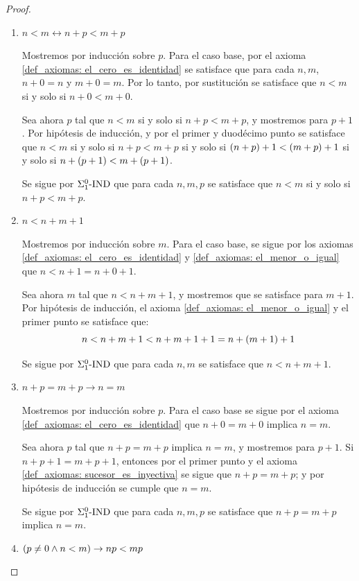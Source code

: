 \begin{proof}
\begin{enumerate}
		\item $ n < m\leftrightarrow n + p < m + p$
		
		Mostremos por inducción sobre $p$. Para el caso base, por el axioma \ref{def_axiomas: el_cero_es_identidad} se satisface que para cada $n, m$, $n + 0 = n$ y $m + 0 = m$. Por lo tanto, por sustitución se satisface que $n < m$ si y solo si $n + 0 < m + 0$.

		Sea ahora $p$ tal que $n < m$ si y solo si $n + p < m + p$, y mostremos para $p + 1$. Por hipótesis de inducción, y por el primer y duodécimo punto se satisface que $n < m$ si y solo si $n + p < m + p$ si y solo si $\pa*{n + p} + 1 <\pa*{m + p} + 1$ si y solo si $n +\pa*{p + 1} < m +\pa*{p + 1}$.

		Se sigue por $\INDUCCION{\Sigma_{1}^{0}}$ que para cada $n, m, p$ se satisface que $n < m$ si y solo si $n + p < m + p$.

		\item $n < n + m + 1$
		
		Mostremos por inducción sobre $m$. Para el caso base, se sigue por los axiomas \ref{def_axiomas: el_cero_es_identidad} y \ref{def_axiomas: el_menor_o_igual} que $n < n + 1 = n + 0 + 1$.

		Sea ahora $m$ tal que $n < n + m + 1$, y mostremos que se satisface para $m + 1$. Por hipótesis de inducción, el axioma \ref{def_axiomas: el_menor_o_igual} y el primer punto se satisface que:
		\[
			n < n + m + 1 < n + m + 1 + 1 = n +\pa*{m + 1} + 1
		\]

		Se sigue por $\INDUCCION{\Sigma_{1}^{0}}$ que para cada $n, m$ se satisface que $n < n + m + 1$.

		\item $n + p = m + p\to n = m$
		
		Mostremos por inducción sobre $p$. Para el caso base se sigue por el axioma \ref{def_axiomas: el_cero_es_identidad} que $n + 0 = m + 0$ implica $n = m$.

		Sea ahora $p$ tal que $n + p = m + p$ implica $n = m$, y mostremos para $p + 1$. Si $n + p + 1 = m + p + 1$, entonces por el primer punto y el axioma \ref{def_axiomas: sucesor_es_inyectiva} se sigue que $n + p = m + p$; y por hipótesis de inducción se cumple que $n = m$.

		Se sigue por $\INDUCCION{\Sigma_{1}^{0}}$ que para cada $n, m, p$ se satisface que $n + p = m + p$ implica $n = m$.

		\item $\pa*{p\neq 0\land n < m}\to np < mp$
		

\end{enumerate}
\end{proof}

